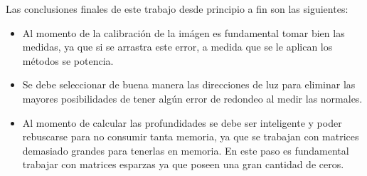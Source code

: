 

Las conclusiones finales de este trabajo desde principio a fin son las siguientes:
\begin{itemize}
\item Al momento de la calibración de la imágen es fundamental tomar bien las medidas, ya que si se arrastra este error, a medida que se le aplican los métodos se potencia.
\item Se debe seleccionar de buena manera las direcciones de luz para eliminar las mayores posibilidades de tener algún error de redondeo al medir las normales.
\item Al momento de calcular las profundidades se debe ser inteligente y poder rebuscarse para no consumir tanta memoria, ya que se trabajan con matrices demasiado grandes para tenerlas en memoria. En este paso es fundamental trabajar con matrices esparzas ya que poseen una gran cantidad de ceros.
\end{itemize}